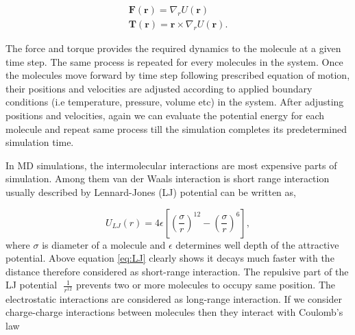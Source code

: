 \begin{subequations}
\begin{gather}
\mathbf F (\mathbf r) = \nabla_r U(\mathbf r) \\
\mathbf {\mathbf{T}}(\mathbf r) = \mathbf r \times \nabla_r U(\mathbf r).
\end{gather}
\label{eq:forceTorque}
\end{subequations}

The force and torque provides the required dynamics to the molecule at a given time step. The same process is repeated for every molecules in the system. Once the molecules move forward by time step following prescribed equation of motion, their positions and velocities are adjusted according to applied boundary conditions (i.e temperature, pressure, volume etc) in the system. After adjusting positions and velocities, again we can evaluate the potential energy for each molecule and repeat same process till the simulation completes its predetermined simulation time.
 
In MD simulations, the intermolecular interactions are most expensive parts of simulation. Among them van der Waals interaction is short range interaction usually described by Lennard-Jones (LJ) potential can be written as,

\begin{equation}
U_{LJ}(r) = 4\epsilon \left[\left(\frac{\sigma}{r} \right)^{12} - \left(\frac{\sigma}{r} \right)^6\right],
\label{eq:LJ}
\end{equation}
where $\sigma$ is diameter of a molecule and $\epsilon$ determines well depth of the attractive potential. Above equation \ref{eq:LJ} clearly shows it decays much faster with the distance therefore considered as short-range interaction. The repulsive part of the  LJ potential $ \textit{~}\frac{1}{r^{12}}$ prevents two or more molecules to occupy same position. The electrostatic interactions are considered as long-range interaction. If we consider charge-charge interactions between molecules then they interact with Coulomb's law 

